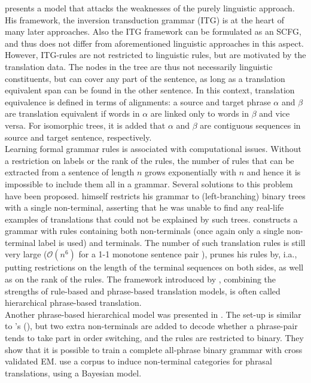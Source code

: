 \documentclass{report}
\theoremstyle{definition}
\theoremstyle{plain}
\def\citepos#1{\citeauthor{#1}'s (\citeyear{#1})}
\begin{document}
\cite{wu1997stochastic} presents a model that attacks the weaknesses of the purely linguistic approach. His framework, the inversion transduction grammar (ITG) is at the heart of many later approaches. Also the ITG framework can be formulated as an SCFG, and thus does not differ from aforementioned linguistic approaches in this aspect. However, ITG-rules are not restricted to linguistic rules, but are motivated by the translation data. The nodes in the tree are thus not necessarily linguistic constituents, but can cover any part of the sentence, as long as a translation equivalent span can be found in the other sentence. In this context, translation equivalence is defined in terms of alignments: a source and target phrase $\alpha$ and $\beta$ are translation equivalent if words in $\alpha$ are linked only to words in $\beta$ and vice versa. For isomorphic trees, it is added that $\alpha$ and $\beta$ are contiguous sequences in source and target sentence, respectively.\\
Learning formal grammar rules is associated with computational issues. Without a restriction on labels or the rank of the rules, the number of rules that can be extracted from a sentence of length $n$ grows exponentially with $n$ and hence it is impossible to include them all in a grammar. Several solutions to this problem have been proposed. \citeauthor{wu1997stochastic} himself restricts his grammar to (left-branching) binary trees with a single non-terminal, asserting that he was unable to find any real-life examples of translations that could not be explained by such trees. \cite{chiang2005hierarchical} constructs a grammar with rules containing both non-terminals (once again only a single non-terminal label is used) and terminals. The number of such translation rules is still very large ($\mathcal{O}(n^6)$ for a 1-1 monotone sentence pair \citep{quirk2005dependency}), \citeauthor{chiang2005hierarchical} prunes his rules by, i.a., putting restrictions on the length of the terminal sequences on both sides, as well as on the rank of the rules. The framework introduced by \citeauthor{chiang2007hierarchical}, combining the strengths of rule-based and phrase-based translation models, is often called hierarchical phrase-based translation. \\
Another phrase-based hierarchical model was presented in \cite{mylonakis2010learning}. The set-up is similar to \citepos{chiang2007hierarchical}, but two extra non-terminals are added to decode whether a phrase-pair tends to take part in order switching, and the rules are restricted to binary. They show that it is possible to train a complete all-phrase binary grammar with cross validated EM. \cite{blunsom2008bayesian} use a corpus to induce non-terminal categories for phrasal translations, using a Bayesian model.
\end{document}
